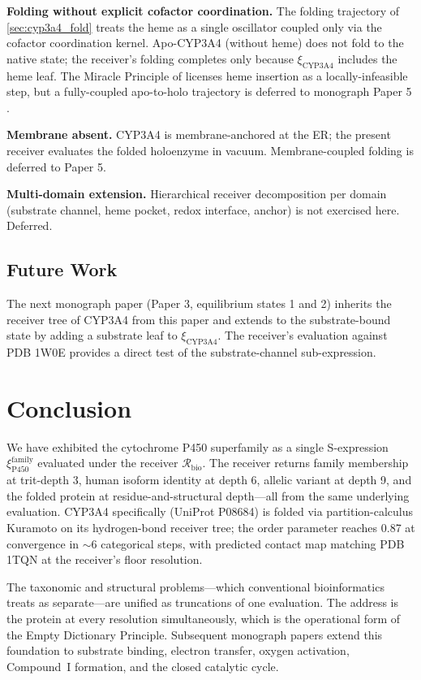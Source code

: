 \documentclass[11pt,twocolumn,a4paper]{article}
\theoremstyle{definition}
\theoremstyle{remark}
\newcommand{\Recv}{\mathcal{R}}
\newcommand{\Sexp}{\xi}
\begin{document}
\textbf{Folding without explicit cofactor coordination.} The folding trajectory of \cref{sec:cyp3a4_fold} treats the heme as a single oscillator coupled only via the cofactor coordination kernel. Apo-CYP3A4 (without heme) does not fold to the native state; the receiver's folding completes only because $\Sexp_{\mathrm{CYP3A4}}$ includes the heme leaf. The Miracle Principle of \citep{sachikonye2025_paper1} licenses heme insertion as a locally-infeasible step, but a fully-coupled apo-to-holo trajectory is deferred to monograph Paper 5 \citep{sachikonye2025_membrane}.

\textbf{Membrane absent.} CYP3A4 is membrane-anchored at the ER; the present receiver evaluates the folded holoenzyme in vacuum. Membrane-coupled folding is deferred to Paper 5.

\textbf{Multi-domain extension.} Hierarchical receiver decomposition per domain (substrate channel, heme pocket, redox interface, anchor) is not exercised here. Deferred.

\subsection{Future Work}

The next monograph paper (Paper 3, equilibrium states 1 and 2) inherits the receiver tree of CYP3A4 from this paper and extends to the substrate-bound state by adding a substrate leaf to $\Sexp_{\mathrm{CYP3A4}}$. The receiver's evaluation against PDB 1W0E provides a direct test of the substrate-channel sub-expression.

\section{Conclusion}
\label{sec:conclusion}

We have exhibited the cytochrome P450 superfamily as a single S-expression $\Sexp_{\mathrm{P450}}^{\mathrm{family}}$ evaluated under the receiver $\Recv_{\mathrm{bio}}$. The receiver returns family membership at trit-depth 3, human isoform identity at depth 6, allelic variant at depth 9, and the folded protein at residue-and-structural depth---all from the same underlying evaluation. CYP3A4 specifically (UniProt P08684) is folded via partition-calculus Kuramoto on its hydrogen-bond receiver tree; the order parameter reaches 0.87 at convergence in $\sim 6$ categorical steps, with predicted contact map matching PDB 1TQN at the receiver's floor resolution.

The taxonomic and structural problems---which conventional bioinformatics treats as separate---are unified as truncations of one evaluation. The address is the protein at every resolution simultaneously, which is the operational form of the Empty Dictionary Principle. Subsequent monograph papers extend this foundation to substrate binding, electron transfer, oxygen activation, Compound~I formation, and the closed catalytic cycle.



\end{document}
